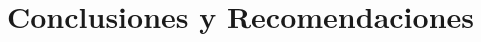 \documentclass[10pt]{beamer}
\begin{document}



\section{Conclusiones y Recomendaciones}
\end{document}
